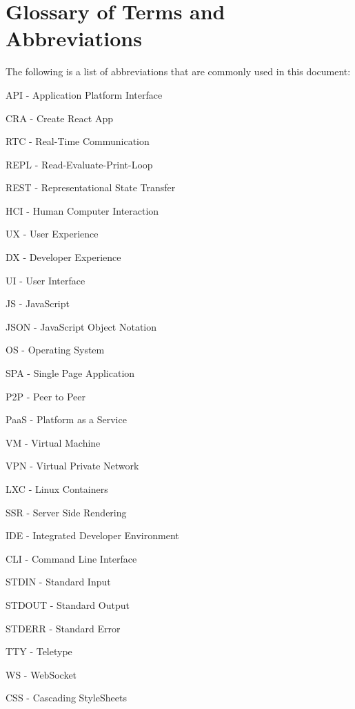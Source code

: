 \section{Glossary of Terms and Abbreviations}
The following is a list of abbreviations that are commonly used in this document:

API - Application Platform Interface

CRA - Create React App

RTC - Real-Time Communication

REPL - Read-Evaluate-Print-Loop

REST - Representational State Transfer

HCI - Human Computer Interaction

UX - User Experience

DX - Developer Experience

UI - User Interface

JS - JavaScript

JSON - JavaScript Object Notation

OS - Operating System

SPA - Single Page Application

P2P - Peer to Peer

PaaS - Platform as a Service

VM - Virtual Machine

VPN - Virtual Private Network

LXC - Linux Containers

SSR - Server Side Rendering

IDE - Integrated Developer Environment

CLI - Command Line Interface 

STDIN - Standard Input

STDOUT - Standard Output

STDERR - Standard Error

TTY - Teletype

WS - WebSocket

CSS - Cascading StyleSheets
\pagebreak
